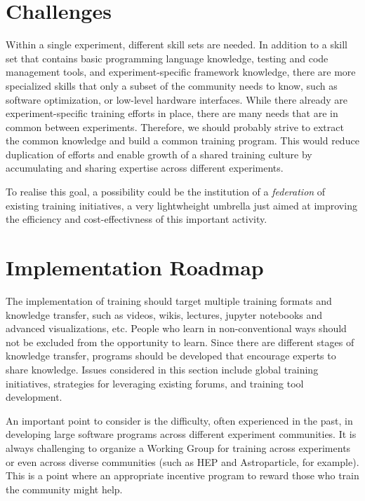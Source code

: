 \documentclass[12pt,a4paper]{article}
\begin{document}
\section{Challenges}

Within a single experiment, different skill sets are needed. In addition to a
skill set that contains basic programming language knowledge, testing and code
management tools, and experiment-specific framework knowledge, there are more
specialized skills that only a subset of the community needs to know, such as
software optimization, or low-level hardware interfaces.
While there already are experiment-specific training efforts in place, there are
many needs that are in common between experiments. Therefore, we should probably
strive to extract the common knowledge and build a common training program. This
would reduce duplication of efforts and enable growth of a shared training
culture by accumulating and sharing expertise across different experiments.

To realise this goal, a possibility could be the institution of a {\em
federation} of existing training initiatives, a very lightwheight umbrella just
aimed at improving the efficiency and cost-effectivness of this important
activity.

\section{Implementation Roadmap}
The implementation of training should target multiple training formats and knowledge transfer, such as videos, wikis, lectures, jupyter notebooks and advanced visualizations, etc.
People who learn in non-conventional ways should not be excluded from the
opportunity to learn. Since there are different stages of knowledge transfer,
programs should be developed that encourage experts to share knowledge. Issues
considered in this section include global training initiatives, strategies for
leveraging existing forums, and training tool development.

An important point to consider is the difficulty, often experienced in the past,
in developing large software programs across different experiment communities.
It is always challenging to organize a Working Group for training across
experiments or even across diverse communities (such as HEP and Astroparticle,
for example). This is a point where an appropriate incentive program to reward
those who train the community might help.

\end{document}
